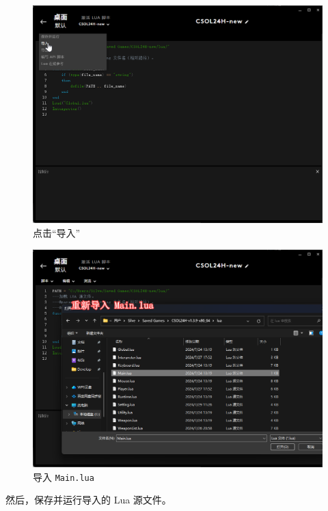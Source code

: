 \begin{figure}[H]
    \Centering
    \includegraphics[width=\textwidth]{docs/assets/update/import_main_00.png}
    \caption{点击“导入”}
\end{figure}

\begin{figure}[H]
    \Centering
    \includegraphics[width=\textwidth]{docs/assets/update/import_main_01.png}
    \caption{导入 \lstinline{Main.lua}}
\end{figure}

然后，保存并运行导入的 Lua 源文件。

